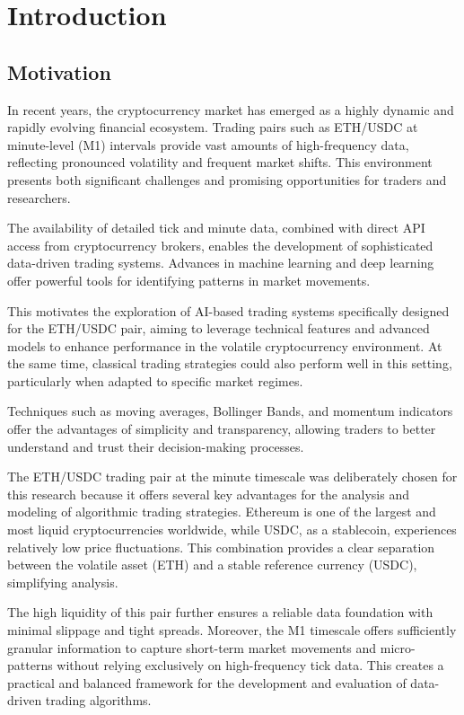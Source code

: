 \section{Introduction}

\subsection{Motivation}

In recent years, the cryptocurrency market has emerged as a highly dynamic and rapidly evolving financial ecosystem.
Trading pairs such as ETH/USDC at minute-level (M1) intervals provide vast amounts of high-frequency data, reflecting pronounced volatility and frequent market shifts.
This environment presents both significant challenges and promising opportunities for traders and researchers.

The availability of detailed tick and minute data, combined with direct API access from cryptocurrency brokers, enables the development of sophisticated data-driven trading systems.
Advances in machine learning and deep learning offer powerful tools for identifying patterns in market movements.

This motivates the exploration of AI-based trading systems specifically designed for the ETH/USDC pair, aiming to leverage technical features and advanced models to enhance performance in the volatile cryptocurrency environment.
At the same time, classical trading strategies could also perform well in this setting, particularly when adapted to specific market regimes.

Techniques such as moving averages, Bollinger Bands, and momentum indicators offer the advantages of simplicity and transparency, allowing traders to better understand and trust their decision-making processes.


The ETH/USDC trading pair at the minute timescale was deliberately chosen for this research because it offers several key advantages for the analysis and modeling of algorithmic trading strategies.
Ethereum is one of the largest and most liquid cryptocurrencies worldwide, while USDC, as a stablecoin, experiences relatively low price fluctuations.
This combination provides a clear separation between the volatile asset (ETH) and a stable reference currency (USDC), simplifying analysis.

The high liquidity of this pair further ensures a reliable data foundation with minimal slippage and tight spreads.
Moreover, the M1 timescale offers sufficiently granular information to capture short-term market movements and micro-patterns without relying exclusively on high-frequency tick data.
This creates a practical and balanced framework for the development and evaluation of data-driven trading algorithms.


